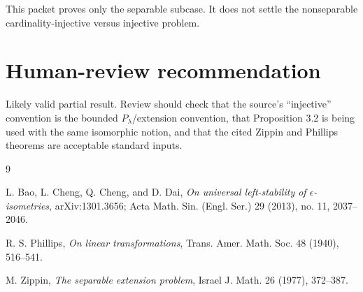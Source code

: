 \documentclass[11pt]{article}
\begin{document}
This packet proves only the separable subcase.  It does not settle the
nonseparable cardinality-injective versus injective problem.

\section*{Human-review recommendation}

Likely valid partial result.  Review should check that the source's
``injective'' convention is the bounded \(P_\lambda\)/extension convention,
that Proposition 3.2 is being used with the same isomorphic notion, and that
the cited Zippin and Phillips theorems are acceptable standard inputs.

\begin{thebibliography}{9}

L. Bao, L. Cheng, Q. Cheng, and D. Dai,
\emph{On universal left-stability of \(\epsilon\)-isometries},
arXiv:1301.3656; Acta Math. Sin. (Engl. Ser.) 29 (2013), no. 11,
2037--2046.

R. S. Phillips,
\emph{On linear transformations},
Trans. Amer. Math. Soc. 48 (1940), 516--541.

M. Zippin,
\emph{The separable extension problem},
Israel J. Math. 26 (1977), 372--387.

\end{thebibliography}
\end{document}
